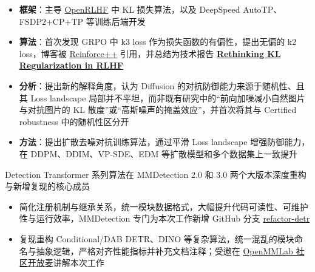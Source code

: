 \documentclass{resume}
\begin{document}
\begin{itemize}
  \item \textbf{框架}：主导 \href{https://github.com/OpenRLHF/OpenRLHF}{OpenRLHF} 中 KL 损失算法，以及 DeepSpeed AutoTP、FSDP2+CP+TP 等训练后端开发
  \item \textbf{算法}：首次发现 GRPO 中 k3 loss 作为损失函数的有偏性，提出无偏的 k2 loss，博客被 \href{https://arxiv.org/abs/2501.03262}{Reinforce++} 引用，并总结为技术报告 \href{https://arxiv.org/abs/2510.01555}{\textbf{Rethinking KL Regularization in RLHF}}
\end{itemize}

\begin{itemize}
  \item \textbf{分析}：提出新的解释角度，认为 Diffusion 的对抗防御能力来源于随机性、且其 Loss landscape 局部并不平坦，而非既有研究中的“前向加噪减小自然图片与对抗图片的 KL 散度”或“高斯噪声的掩盖效应”，并首次将其与 Certified robustness 中的随机性区分开
  \item \textbf{方法}：提出扩散去噪对抗训练算法，通过平滑 Loss landscape 增强防御能力，在 DDPM、DDIM、VP-SDE、EDM 等扩散模型和多个数据集上一致提升
\end{itemize}

Detection Transformer 系列算法在 MMDetection 2.0 和 3.0 两个大版本深度重构与新增复现的核心成员
\begin{itemize}
  \item 简化注册机制与继承关系，统一模块数据格式，大幅提升代码可读性、可维护性与运行效率，MMDetection 专门为本次工作新增 GitHub 分支 \href{https://github.com/open-mmlab/mmdetection/tree/refactor-detr}{refactor-detr}
  \item 复现重构 Conditional/DAB DETR、DINO 等复杂算法，统一混乱的模块命名与抽象逻辑，严格对齐性能指标并补充文档注释；受邀在 \href{https://www.bilibili.com/video/BV17x4y1w7ZK/?spm_id_from=333.337.search-card.all.click}{OpenMMLab 社区开放麦}讲解本次工作
\end{itemize}
\end{document}
